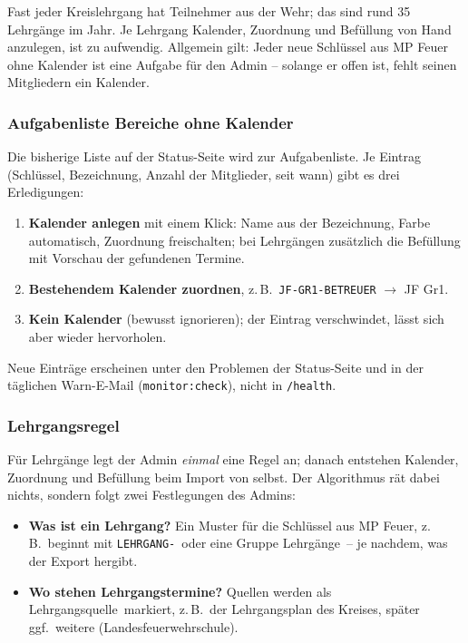\documentclass[a4paper,fontsize=10pt]{scrartcl}
\newcommand{\code}[1]{\texttt{#1}}
\begin{document}
Fast jeder Kreislehrgang hat Teilnehmer aus der Wehr; das sind rund 35
Lehrgänge im Jahr. Je Lehrgang Kalender, Zuordnung und Befüllung von Hand
anzulegen, ist zu aufwendig. Allgemein gilt: Jeder neue Schlüssel aus MP Feuer
ohne Kalender ist eine Aufgabe für den Admin -- solange er offen ist, fehlt
seinen Mitgliedern ein Kalender.

\subsubsection*{Aufgabenliste \glqq Bereiche ohne Kalender\grqq}

Die bisherige Liste auf der Status-Seite wird zur Aufgabenliste. Je Eintrag
(Schlüssel, Bezeichnung, Anzahl der Mitglieder, seit wann) gibt es drei
Erledigungen:
\begin{enumerate}
  \item \textbf{Kalender anlegen} mit einem Klick: Name aus der Bezeichnung,
        Farbe automatisch, Zuordnung \glqq freischalten\grqq; bei Lehrgängen
        zusätzlich die Befüllung mit Vorschau der gefundenen Termine.
  \item \textbf{Bestehendem Kalender zuordnen}, z.\,B.\ \code{JF-GR1-BETREUER}
        $\rightarrow$ JF Gr1.
  \item \textbf{Kein Kalender} (bewusst ignorieren); der Eintrag verschwindet,
        lässt sich aber wieder hervorholen.
\end{enumerate}
Neue Einträge erscheinen unter den Problemen der Status-Seite und in der
täglichen Warn-E-Mail (\code{monitor:check}), nicht in \code{/health}.

\subsubsection*{Lehrgangsregel}

Für Lehrgänge legt der Admin \emph{einmal} eine Regel an; danach entstehen
Kalender, Zuordnung und Befüllung beim Import von selbst. Der Algorithmus
rät dabei nichts, sondern folgt zwei Festlegungen des Admins:

\begin{itemize}
  \item \textbf{Was ist ein Lehrgang?} Ein Muster für die Schlüssel aus MP Feuer,
        z.\,B.\ \glqq beginnt mit \code{LEHRGANG-}\grqq\ oder eine Gruppe
        \glqq Lehrgänge\grqq\ -- je nachdem, was der Export hergibt.
  \item \textbf{Wo stehen Lehrgangstermine?} Quellen werden als
        \glqq Lehrgangsquelle\grqq\ markiert, z.\,B.\ der Lehrgangsplan des
        Kreises, später ggf.\ weitere (Landesfeuerwehrschule).
\end{itemize}
\end{document}
